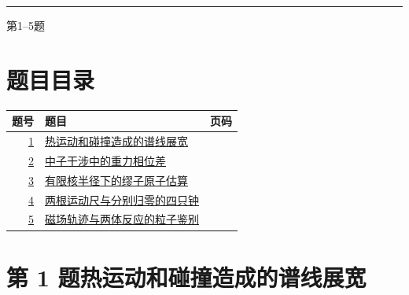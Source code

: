 \documentclass[UTF8,fontset=fandol,a4paper,11pt]{ctexart}
\begin{document}

\thispagestyle{empty}\vspace*{22mm}

\par\vspace{12mm}

\par\vspace{12mm}

\par\vspace{9mm}

\noindent\textcolor{accent}{\rule{\linewidth}{1pt}}\par\vspace{9mm}

\noindent 第1--5题\par\vfill\clearpage

\section*{题目目录}

\begin{longtable}{@{}r p{113mm} r@{}}\toprule 题号 & 题目 & 页码\\\midrule

\hyperref[q:1]{1} & \hyperref[q:1]{热运动和碰撞造成的谱线展宽} & \pageref{q:1} \\

\hyperref[q:2]{2} & \hyperref[q:2]{中子干涉中的重力相位差} & \pageref{q:2} \\

\hyperref[q:3]{3} & \hyperref[q:3]{有限核半径下的缪子原子估算} & \pageref{q:3} \\

\hyperref[q:4]{4} & \hyperref[q:4]{两根运动尺与分别归零的四只钟} & \pageref{q:4} \\

\hyperref[q:5]{5} & \hyperref[q:5]{磁场轨迹与两体反应的粒子鉴别} & \pageref{q:5} \\

\bottomrule\end{longtable}

\clearpage


\section*{第 1 题\quad 热运动和碰撞造成的谱线展宽}\label{q:1}
\end{document}
